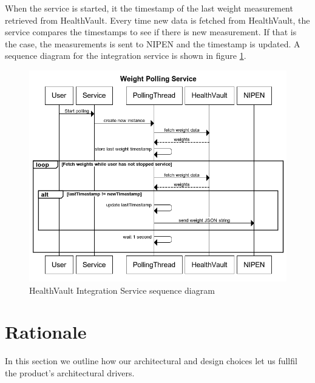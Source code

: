 When the service is started, it the timestamp of the last weight measurement retrieved from HealthVault.
Every time new data is fetched from HealthVault, the service compares the timestamps to see if there is new measurement.
If that is the case, the measurements is sent to NIPEN and the timestamp is updated.
A sequence diagram for the integration service is shown in figure \ref{figure:weight-polling-service}.

\begin{figure}[h]
\centering
\includegraphics[scale=0.8]{../Figures/weight-polling-service.png}
\caption{HealthVault Integration Service sequence diagram}
\label{figure:weight-polling-service}
\end{figure}

\clearpage
\section{Rationale}

In this section we outline how our architectural and design choices let us fullfil
the product's architectural drivers.

